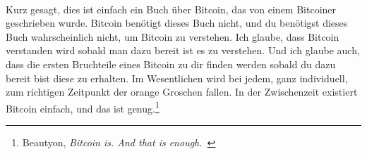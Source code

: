 \paragraph{}
Kurz gesagt, dies ist einfach ein Buch über Bitcoin, das von einem Bitcoiner
geschrieben wurde. Bitcoin benötigt dieses Buch nicht, und du benötigst dieses
Buch wahrscheinlich nicht, um Bitcoin zu verstehen. Ich glaube, dass Bitcoin
verstanden wird sobald man dazu bereit ist es zu verstehen. Und ich glaube auch,
dass die ersten Bruchteile eines Bitcoin zu dir finden werden sobald du dazu
bereit bist diese zu erhalten. Im Wesentlichen wird bei jedem, ganz individuell,
zum richtigen Zeitpunkt der orange Groschen fallen. In der Zwischenzeit
existiert Bitcoin einfach, und das ist genug.\footnote{Beautyon,
\textit{Bitcoin is. And that is enough.}~\cite{bitcoin-is}}
